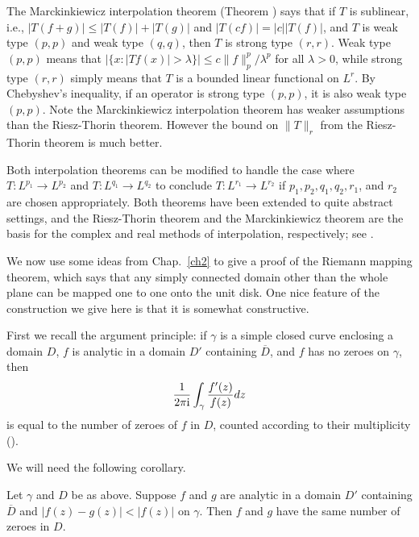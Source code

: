 
The Marckinkiewicz interpolation theorem (Theorem ) says that if $T$ is sublinear, i.e., $|T(f + g)| \leq |T(f)| + |T(g)|$ and $|T(cf)| = |c||T(f)|$, and $T$ is weak type $(p,p)$ and weak type $(q,q)$, then $T$ is strong type $(r,r)$. Weak type $(p,p)$ means that $|\{x : |Tf(x)| > \lambda\}| \leq c\|f\|_p^p/\lambda^p$ for all $\lambda > 0$, while strong type $(r,r)$ simply means that $T$ is a bounded linear functional on $L^r$. By Chebyshev's inequality, if an operator is strong type $(p,p)$, it is also weak type $(p,p)$. Note the Marckinkiewicz interpolation theorem has weaker assumptions than the Riesz-Thorin theorem. However the bound on $\|T\|_r$ from the Riesz-Thorin theorem is much better.

Both interpolation theorems can be modified to handle the case where $T : L^{p_1} \to L^{p_2}$ and $T : L^{q_1} \to L^{q_2}$ to conclude $T : L^{r_1} \to L^{r_2}$ if $p_1,p_2,q_1,q_2,r_1$, and $r_2$ are chosen appropriately. Both theorems have been extended to quite abstract settings, and the Riesz-Thorin theorem and the Marckinkiewicz theorem are the basis for the complex and real methods of interpolation, respectively; see \cite{BerghLofstrom1976}.


We now use some ideas from Chap.\ \ref{ch2} to give a proof of the Riemann mapping theorem, which says that any simply connected domain other than the whole plane can be mapped one to one onto the unit disk. One nice feature of the construction we give here is that it is somewhat constructive.

First we recall the argument principle: if $\gamma$ is a simple closed curve enclosing a domain $D$, $f$ is analytic in a domain $D'$ containing $\overline{D}$, and $f$ has no zeroes on $\gamma$, then
\[
    \frac{1}{2\pi \mathrm{i}}\int_\gamma \frac{f'(z)}{f(z)}dz
\]
is equal to the number of zeroes of $f$ in $D$, counted according to their multiplicity (\cite[see][p.~151]{Ahlfors1979}).

We will need the following corollary.

\begin{corollary}\label{cor:ch5_1.12}
Let $\gamma$ and $D$ be as above. Suppose $f$ and $g$ are analytic in a domain $D'$ containing $\overline{D}$ and $|f(z) - g(z)| < |f(z)|$ on $\gamma$. Then $f$ and $g$ have the same number of zeroes in $D$.
\end{corollary}

